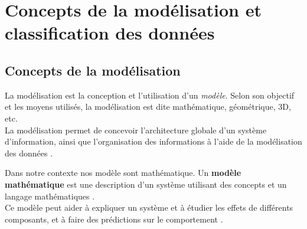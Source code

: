 	
	
	
	
	\section{Concepts de la modélisation et classification des données}
	
	\subsection{{Concepts de la modélisation}}\label{subsec:modelisation}
	La modélisation est la conception et l'utilisation d'un \textit{modèle}. Selon son objectif et les moyens utilisés, la modélisation est dite mathématique, géométrique, 3D, etc. \\
	La modélisation permet de concevoir l'architecture globale d'un système d'information, ainsi que l'organisation des informations à l'aide de la modélisation des données \cite{matloff2017statistical}.
	
	Dans notre contexte nos modèle sont mathématique. Un \textbf{modèle mathématique} est une description d'un système utilisant des concepts et un langage mathématiques \cite{darlington2016regression}.\\
	Ce modèle peut aider à expliquer un système et à étudier les effets de différents composants, et à faire des prédictions sur le comportement \cite{harrell2001regression}.
	
	
